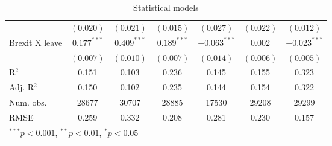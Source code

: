 \documentclass{article}
\begin{document}
\begin{table}
\begin{center}
{\begin{tabular}{l c c c c c c}
                                 & $(0.020)$      & $(0.021)$      & $(0.015)$      & $(0.027)$      & $(0.022)$      & $(0.012)$      \\
Brexit X leave                   & $0.177^{***}$  & $0.409^{***}$  & $0.189^{***}$  & $-0.063^{***}$ & $0.002$        & $-0.023^{***}$ \\
                                 & $(0.007)$      & $(0.010)$      & $(0.007)$      & $(0.014)$      & $(0.006)$      & $(0.005)$      \\
\hline
R$^2$                            & 0.151          & 0.103          & 0.236          & 0.145          & 0.155          & 0.323          \\
Adj. R$^2$                       & 0.150          & 0.102          & 0.235          & 0.144          & 0.154          & 0.322          \\
Num. obs.                        & 28677          & 30707          & 28885          & 17530          & 29208          & 29299          \\
RMSE                             & 0.259          & 0.332          & 0.208          & 0.281          & 0.230          & 0.157          \\
\hline
\multicolumn{7}{l}{\scriptsize{$^{***}p<0.001$, $^{**}p<0.01$, $^*p<0.05$}}
\end{tabular}
}
\caption{Statistical models}
\label{table:coefficients}
\end{center}
\end{table}

\end{document}
